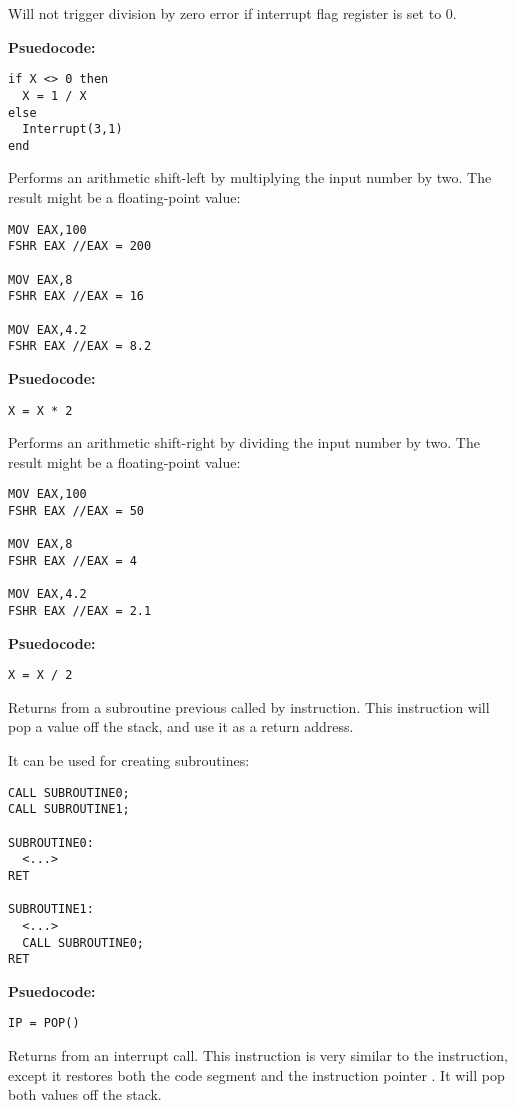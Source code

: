 
Will not trigger division by zero error if interrupt flag register  is set to 0.

\textbf{Psuedocode:}
\begin{verbatim}
if X <> 0 then
  X = 1 / X
else
  Interrupt(3,1)
end
\end{verbatim}


Performs an arithmetic shift-left by multiplying the input number by two. The result might be a floating-point value:
\begin{verbatim}
MOV EAX,100
FSHR EAX //EAX = 200

MOV EAX,8
FSHR EAX //EAX = 16

MOV EAX,4.2
FSHR EAX //EAX = 8.2
\end{verbatim}

\textbf{Psuedocode:}
\begin{verbatim}
X = X * 2
\end{verbatim}


Performs an arithmetic shift-right by dividing the input number by two. The result might be a floating-point value:
\begin{verbatim}
MOV EAX,100
FSHR EAX //EAX = 50

MOV EAX,8
FSHR EAX //EAX = 4

MOV EAX,4.2
FSHR EAX //EAX = 2.1
\end{verbatim}

\textbf{Psuedocode:}
\begin{verbatim}
X = X / 2
\end{verbatim}


Returns from a subroutine previous called by  instruction. This instruction will pop a value off the stack, and use it as a return address.

It can be used for creating subroutines:
\begin{verbatim}
CALL SUBROUTINE0;
CALL SUBROUTINE1;

SUBROUTINE0:
  <...>
RET

SUBROUTINE1:
  <...>
  CALL SUBROUTINE0;
RET
\end{verbatim}


\textbf{Psuedocode:}
\begin{verbatim}
IP = POP()
\end{verbatim}


Returns from an interrupt call. This instruction is very similar to the  instruction, except it restores both the code segment  and the instruction pointer . It will pop both values off the stack.

